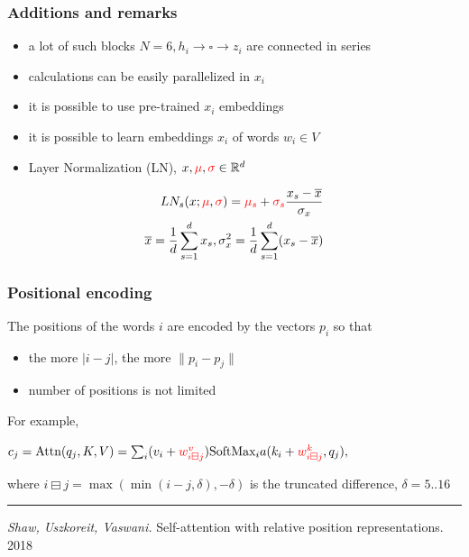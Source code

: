 \documentclass[fullscreen=true, bookmarks=true, hyperref={pdfencoding=unicode}]{beamer}
\begin{document}
\begin{frame}
  \frametitle{Additions and remarks}

    \begin{itemize}
      \item a lot of such blocks $N=6, h_i \to \square \to z_i$ are connected in series
      \item calculations can be easily parallelized in $x_i$
      \item it is possible to use pre-trained $x_i$ embeddings
      \item it is possible to learn embeddings $x_i$ of words $w_i \in V$
      \item Layer Normalization (LN), $x, {\color{red}\mu}, {\color{red}\sigma} \in \mathbb{R}^d$
    \end{itemize}

    \begin{align*}
      LN_s(x; {\color{red}\mu}, {\color{red}\sigma}) = {\color{red}\mu_s} + {\color{red}\sigma_s} \frac{x_s - \overline{x}}{\sigma_x} \\
      \overline{x} = \frac{1}{d} \sum\limits_{s=1}^d x_s, \sigma_x^2 = \frac{1}{d} \sum\limits_{s=1}^ d (x_s - \overline{x})
    \end{align*}
\end{frame}


\begin{frame}
  \frametitle{Positional encoding}

   The positions of the words $i$ are encoded by the vectors $p_i$ so that
   \begin{itemize}
     \item the more $|i-j|$, the more $\|p_i-p_j\|$
     \item number of positions is not limited
   \end{itemize}

   \pause
   \vspace{1cm}
   For example,

   $ c_j = \text{Attn}(q_j, K, V) = \sum_i (v_i + {\color{red}w^v_{i\boxminus j}}) \text{SoftMax}_i a(k_i + {\color{red} w^k_{i\boxminus j}}, q_j), $

   where $i\boxminus j = \max(\min(i-j, \delta), -\delta)$ is the truncated difference, $\delta = 5..16$

   \vspace{1cm}
   \noindent\rule{8cm}{0.4pt}

   {\small
   {\it Shaw, Uszkoreit, Vaswani.} Self-attention with relative position representations. 2018}
\end{frame}
\end{document}
